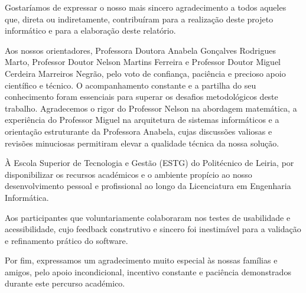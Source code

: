 
Gostaríamos de expressar o nosso mais sincero agradecimento a todos aqueles que, direta ou indiretamente, contribuíram para a realização deste projeto informático e para a elaboração deste relatório.

Aos nossos orientadores, Professora Doutora Anabela Gonçalves Rodrigues Marto, Professor Doutor Nelson Martins Ferreira e Professor Doutor Miguel Cerdeira Marreiros Negrão, pelo voto de confiança, paciência e precioso apoio científico e técnico. O acompanhamento constante e a partilha do seu conhecimento foram essenciais para superar os desafios metodológicos deste trabalho. Agradecemos o rigor do Professor Nelson na abordagem matemática, a experiência do Professor Miguel na arquitetura de sistemas informáticos e a orientação estruturante da Professora Anabela, cujas discussões valiosas e revisões minuciosas permitiram elevar a qualidade técnica da nossa solução.

À Escola Superior de Tecnologia e Gestão (ESTG) do Politécnico de Leiria, por disponibilizar os recursos académicos e o ambiente propício ao nosso desenvolvimento pessoal e profissional ao longo da Licenciatura em Engenharia Informática.

Aos participantes que voluntariamente colaboraram nos testes de usabilidade e acessibilidade, cujo feedback construtivo e sincero foi inestimável para a validação e refinamento prático do software.

Por fim, expressamos um agradecimento muito especial às nossas famílias e amigos, pelo apoio incondicional, incentivo constante e paciência demonstrados durante este percurso académico.

\MediaOptionLogicBlank
